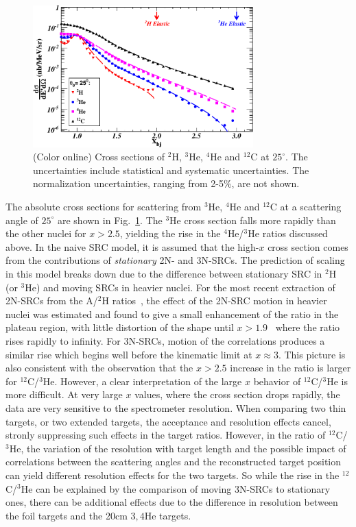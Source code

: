                 \begin{figure}[!ht]
		\begin{center}
		\includegraphics[width=8.5cm,angle=0]{Plot_XS_25_MC}
		\end{center}
		\vspace*{-5mm}
		\caption{(Color online) Cross sections of $^2$H, $^3$He, $^4$He and $^{12}$C at $25^{\circ}$. The uncertainties include statistical and
		systematic uncertainties. The normalization uncertainties, ranging from 2-5\%, are not shown.}
		\label{xs}
		\end{figure}

The absolute cross sections for scattering from $^{3}$He, $^{4}$He and $^{12}$C at a scattering angle of
$25^{\circ}$ are shown in Fig.~\ref{xs}. The $^3$He cross section falls more rapidly than the other nuclei
for $x>2.5$, yielding the rise in the $^4$He/$^3$He ratios discussed above. In the naive SRC model, it is
assumed that the high-$x$ cross section comes from the contributions of \textit{stationary} 2N- and 3N-SRCs.
The prediction of scaling in this model breaks down due to the difference between stationary SRC in $^2$H
(or $^3$He) and moving SRCs in heavier nuclei. For the most recent extraction of 2N-SRCs from the A/$^2$H
ratios~\cite{fomin2012}, the effect of the 2N-SRC motion in heavier nuclei was estimated and found to give a
small enhancement of the ratio in the plateau region, with little distortion of the shape until $x >
1.9$~\cite{fomin2012} where the ratio rises rapidly to infinity. For 3N-SRCs, motion of the correlations
produces a similar rise which begins well before the kinematic limit at $x \approx 3$. This picture is also
consistent with the observation that the $x > 2.5$ increase in the ratio is larger for $^{12}$C/$^3$He.
However, a clear interpretation of the large $x$ behavior of $^{12}$C/$^3$He is more difficult. At very large
$x$ values, where the cross section drops rapidly, the data are very sensitive to the spectrometer resolution.
When comparing two thin targets, or two extended targets, the acceptance and resolution effects cancel, 
stronly suppressing such effects in the target ratios. However, in the ratio of $^{12}$C/$^3$He, the variation
of the resolution with target length and the possible impact of correlations between the scattering angles and
the reconstructed target position can yield different resolution effects for the two targets. So while the
rise in the $^{12}$C/$^3$He can be explained by the comparison of moving 3N-SRCs to stationary ones, there
can be additional effects due to the difference in resolution between the foil targets and the 20cm ${3,4}$He
targets.


